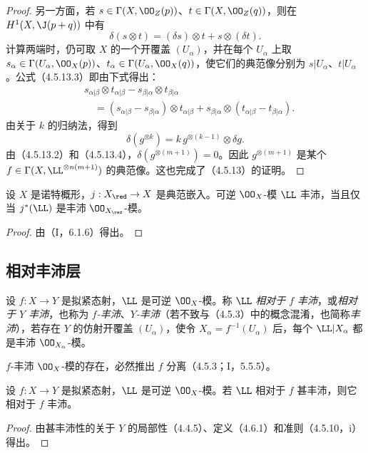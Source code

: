 \begin{proof}
另一方面，若 $s\in\Gamma(X,\OO_Z(p))$、$t\in\Gamma(X,\OO_Z(q))$，则在 $H^1(X,\J(p+q))$ 中有
\begin{equation}
\delta(s\otimes t)=(\delta s)\otimes t+s\otimes(\delta t).
\tag{4.5.13.3}
\end{equation}
计算两端时，仍可取 $X$ 的一个开覆盖 $(U_\alpha)$，并在每个 $U_\alpha$ 上取
$s_\alpha\in\Gamma(U_\alpha,\OO_X(p))$、$t_\alpha\in\Gamma(U_\alpha,\OO_X(q))$，使它们的典范像分别为 $s|U_\alpha$、$t|U_\alpha$。公式（4.5.13.3）即由下式得出：
\[
\begin{aligned}
&s_{\alpha|\beta}\otimes t_{\alpha|\beta}
-s_{\beta|\alpha}\otimes t_{\beta|\alpha}\\
&\quad=(s_{\alpha|\beta}-s_{\beta|\alpha})\otimes t_{\alpha|\beta}
+s_{\beta|\alpha}\otimes(t_{\alpha|\beta}-t_{\beta|\alpha}).
\end{aligned}
\]
由关于 $k$ 的归纳法，得到
\begin{equation}
\delta(g^{\otimes k})=k\,g^{\otimes(k-1)}\otimes\delta g.
\tag{4.5.13.4}
\end{equation}
由（4.5.13.2）和（4.5.13.4），$\delta(g^{\otimes(m+1)})=0$。因此 $g^{\otimes(m+1)}$ 是某个
$f\in\Gamma(X,\LL^{\otimes n(m+1)})$ 的典范像。这也完成了（4.5.13）的证明。
\end{proof}

设 $X$ 是诺特概形，$j:X_{\red}\to X$ 是典范嵌入。可逆 $\OO_X$-模 $\LL$ 丰沛，当且仅当 $j^*(\LL)$ 是丰沛 $\OO_{X_{\red}}$-模。
\begin{proof}
由（I，6.1.6）得出。
\end{proof}

\subsection{相对丰沛层}

设 $f:X\to Y$ 是拟紧态射，$\LL$ 是可逆 $\OO_X$-模。称 $\LL$ \emph{相对于 $f$ 丰沛}，或\emph{相对于 $Y$ 丰沛}，也称为 \emph{$f$-丰沛}、\emph{$Y$-丰沛}（若不致与（4.5.3）中的概念混淆，也简称\emph{丰沛}），若存在 $Y$ 的仿射开覆盖 $(U_\alpha)$，使令 $X_\alpha=f^{-1}(U_\alpha)$ 后，每个 $\LL|X_\alpha$ 都是丰沛 $\OO_{X_\alpha}$-模。

$f$-丰沛 $\OO_X$-模的存在，必然推出 $f$ 分离（4.5.3；I，5.5.5）。

设 $f:X\to Y$ 是拟紧态射，$\LL$ 是可逆 $\OO_X$-模。若 $\LL$ 相对于 $f$ 甚丰沛，则它相对于 $f$ 丰沛。
\begin{proof}
由甚丰沛性的关于 $Y$ 的局部性（4.4.5）、定义（4.6.1）和准则（4.5.10，i）得出。
\end{proof}

